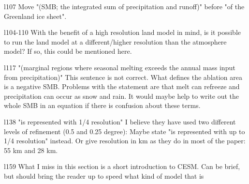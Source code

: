 \documentclass[12pt,oneside,a4paper]{article}%
\begin{document}
{\color{blue}{Sentence beginning with conversely has been reformulated to improve clarity.}} \newline

l107 Move "(SMB; the integrated sum of precipitation and runoff)" before "of the Greenland ice sheet". \newline

{\color{blue}{Done.}} \newline

l104-110 With the benefit of a high resolution land model in mind, is it possible to run the land model at a different/higher resolution than the atmosphere model? If so, this could be mentioned here. \newline

{\color{blue}{As discussed above, I'm not optimistic about the utility of a higher-res land model, and would rather not go on a tangent about custom configurations.}} \newline

l117 "(marginal regions where seasonal melting exceeds the annual mass input from precipitation)" This sentence is not correct. What defines the ablation area is a negative SMB. Problems with the statement are that melt can refreeze and precipitation can occur as snow and rain. It would maybe help to write out the whole SMB in an equation if there is confusion about these terms. \newline

{\color{blue}{Replaced with ``marginal regions where the annual SMB is negative."}} \newline

l138 "is represented with 1/4 resolution" I believe they have used two different levels of refinement (0.5 and 0.25 degree): Maybe state "is represented with up to 1/4 resolution" instead. Or give resolution in km as they do in most of the paper: 55 km and 28 km. \newline

{\color{blue}{Used reviewers ``up to" suggestion.}} \newline

l159 What I miss in this section is a short introduction to CESM. Can be brief, but should bring the reader up to speed what kind of model that is \newline

{\color{blue}{Included a short introduction to CESM. Also moved language from the experimental design section in here, as well as include a statement that the ice sheet model is not dynamically active. Our hope is that by including this at the very top of the methods section, this partly addresses the reviewers concern that it is not clear we are not running with an active ice sheet.}} \newline
\end{document}
